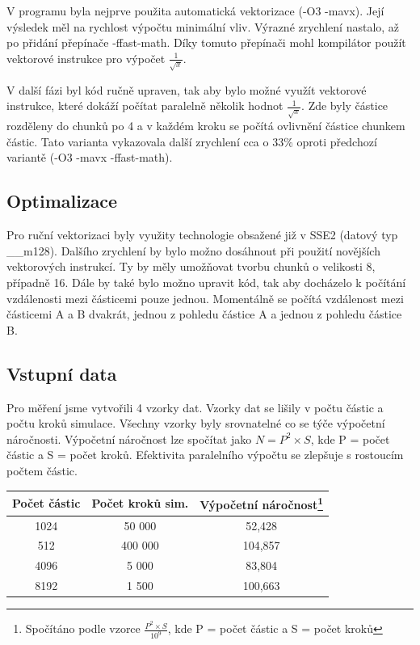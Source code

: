 \documentclass[12pt]{article}
\begin{document}
V prog\-ramu byla nej\-prve pou\-žita au\-toma\-tická vekto\-ri\-za\-ce (-O3 -mavx).
Její výsledek měl na rychlost výpočtu minimální vliv. Výrazné zrychlení nastalo, až po přidání přepínače -ffast-math.
Díky tomuto přepínači mohl kompilátor použít vektorové instrukce pro výpočet ${\frac{1}{\sqrt{x}}}$. 

V další fázi byl kód ručně upraven, tak aby bylo možné využít vektorové instrukce, které dokáží počítat paralelně několik hodnot ${\frac{1}{\sqrt{x}}}$.
Zde byly částice rozděleny do chunků po 4 a v každém kroku se počítá ovlivnění částice chunkem částic.
Tato varianta vykazovala další zrychlení cca o 33\% oproti předchozí variantě (-O3 -mavx -ffast-math).

\subsection{Optimalizace}
Pro ruční vektorizaci byly využity technologie obsažené již v SSE2 (datový typ \_\_m128). Dalšího zrychlení by bylo možno dosáhnout při použití novějších vektorových instrukcí.
Ty by měly umožňovat tvorbu chunků o velikosti 8, případně 16.
Dále by také bylo možno upravit kód, tak aby docházelo k počítání vzdálenosti mezi částicemi pouze jednou.
Momentálně se počítá vzdálenost mezi částicemi A a B dvakrát, jednou z pohledu částice A a jednou z pohledu částice B.

\subsection{Vstupní data}
Pro měření jsme vytvořili 4 vzorky dat. Vzorky dat se lišily v počtu částic a počtu kroků simulace.
Všechny vzorky byly srovnatelné co se týče výpočetní náročnosti. Výpočetní náročnost lze spočítat jako ${N = P^2 \times S}$, kde P = počet částic a S = počet kroků.
Efektivita paralelního výpočtu se zlepšuje s rostoucím počtem částic.

\begin{center}
\begin{tabular}{c | c | c }
\textbf{Počet částic} & \textbf{Počet kroků sim.}  & \textbf{Výpočetní náročnost}\footnote{Spočítáno podle vzorce ${\frac{P^2 \times S}{10^9}}$, kde P = počet částic a S = počet kroků} \\ \hline \hline
1024 & 50 000 & 52,428 \\ \hline
512 & 400 000 & 104,857 \\ \hline
4096 & 5 000 & 83,804 \\ \hline
8192 & 1 500 & 100,663 \\ \hline
\end{tabular}
\end{center}
\end{document}
